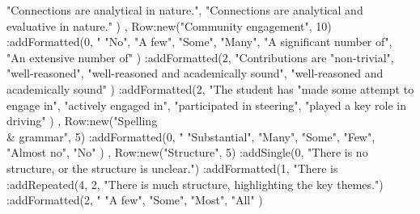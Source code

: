 \documentclass{../../fal_assignment}
\begin{document}
\begin{luacode*}
{{				"Connections are analytical in nature.",
				"Connections are analytical and evaluative in nature." })
		,
		Row:new("Community engagement", 10)
			:addFormatted(0, "%
				{ "No", "A few", "Some", "Many", "A significant number of", "An extensive number of" })
			:addFormatted(2, "Contributions are %
				{ "non-trivial", "well-reasoned",
					"well-reasoned and academically sound", "well-reasoned and academically sound" })
			:addFormatted(2, "The student has %
				{ "made some attempt to engage in", "actively engaged in",
					"participated in steering", "played a key role in driving" })
		,
		Row:new("Spelling \\& grammar", 5)
			:addFormatted(0, "%
				{ "Substantial", "Many", "Some", "Few", "Almost no", "No" })
		,
		Row:new("Structure", 5)
			:addSingle(0, "There is no structure, or the structure is unclear.")
			:addFormatted(1, "There is %
			:addRepeated(4, 2, "There is much structure, highlighting the key themes.")
			:addFormatted(2, "%
				{ "A few", "Some", "Most", "All" })
	}
\end{luacode*}
\end{document}
